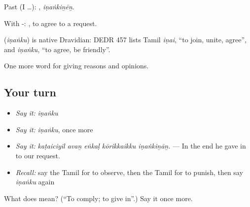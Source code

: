 Past (I …): , \emph{iṇaṅkiṉēṉ}.

With -:  , to agree to a request.

\begin{cousinweb}
\textbf{} (\emph{iṇaṅku}) is native Dravidian: DEDR 457 lists Tamil \emph{iṇai}, \textquotedblleft{}to join, unite, agree\textquotedblright{}, and \emph{iṇaṅku}, \textquotedblleft{}to agree, be friendly\textquotedblright{}.
\end{cousinweb}

\begin{grammarlens}[title={What you've built}]
One more word for giving reasons and opinions.
\end{grammarlens}

\subsection*{Your turn}
\begin{itemize}
\raggedright
  \item \emph{Say it:} \emph{iṇaṅku}
  \item \emph{Say it:} \emph{iṇaṅku}, once more
  \item \emph{Say it:} \emph{kaṭaiciyil avaṉ eṅkaḷ kōrikkaikku iṇaṅkiṉāṉ.} — In the end he gave in to our request.
  \item \emph{Recall:} say the Tamil for to observe, then the Tamil for to punish, then say \emph{iṇaṅku} again
\end{itemize}

\begin{tcolorbox}[breakable,colback=teal!4,colframe=teal!35!black,title={Before you move on}]
What does  mean? (\textquotedblleft{}To comply; to give in\textquotedblright{}.) Say it once more.
\end{tcolorbox}
